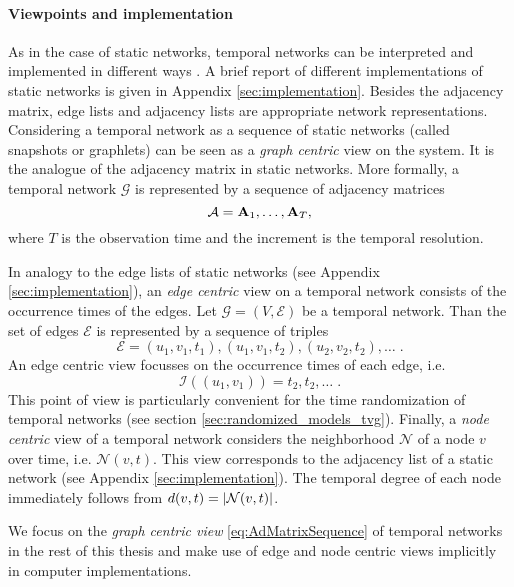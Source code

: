 \paragraph{Viewpoints and implementation\color{Cayenne}{.}}
As in the case of static networks, temporal networks can be interpreted and implemented in different ways \citep{Casteights_review}.
A brief report of different implementations of static networks is given in Appendix \ref{sec:implementation}.
Besides the adjacency matrix, edge lists and adjacency lists are appropriate network representations.
Considering a temporal network as a sequence of static networks (called snapshots or graphlets) can be seen as a \emph{graph centric} view on the system.
It is the analogue of the adjacency matrix in static networks.
More formally, a temporal network $\mathcal{G}$ is represented by a sequence of adjacency matrices
\begin{equation}\label{eq:AdMatrixSequence}
\mathcal{A}=\mathbf{A}_1,\dots ,\mathbf{A}_T,
\end{equation}
where $T$ is the observation time and the increment is the temporal resolution.

In analogy to the edge lists of static networks (see Appendix \ref{sec:implementation}), an \emph{edge centric} view on a temporal network consists of the occurrence times of the edges.
Let $\mathcal{G}=(V,\mathcal{E})$ be a temporal network.
Than the set of edges $\mathcal{E}$ is represented by a sequence of triples
\begin{equation*}%
\mathcal{E}=(u_1,v_1,t_1),(u_1,v_1,t_2),(u_2,v_2,t_2),\dots \;.
\end{equation*}
An edge centric view focusses on the occurrence times of each edge, i.e.
\[
\mathcal{I}((u_1,v_1))=t_2,t_2,\dots \; .
\]
This point of view is particularly convenient for the time randomization of temporal networks (see section \ref{sec:randomized_models_tvg}).
Finally, a \emph{node centric} view of a temporal network considers the neighborhood $\mathcal{N}$ of a node $v$ over time, i.e. $\mathcal{N}(v,t)$.
This view corresponds to the adjacency list of a static network (see Appendix \ref{sec:implementation}).
The temporal degree of each node immediately follows from $d(v,t)=\left| \mathcal{N}(v,t) \right|$.

We focus on the \emph{graph centric view} \eqref{eq:AdMatrixSequence} of temporal networks in the rest of this thesis and make use of edge and node centric views implicitly in computer implementations.

